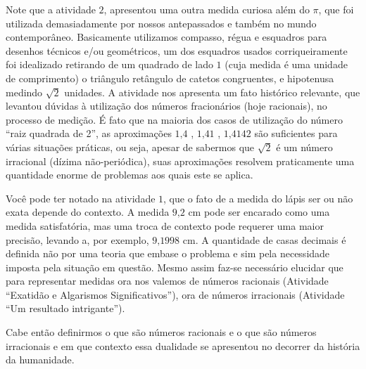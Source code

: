 Note que a atividade $2$, apresentou uma outra medida curiosa além do $\pi$, que foi utilizada demasiadamente por nossos antepassados e também no mundo contemporâneo. Basicamente utilizamos compasso, régua e esquadros para desenhos técnicos e/ou geométricos, um dos esquadros usados corriqueiramente foi idealizado retirando de um quadrado de lado $1$ (cuja medida é uma unidade de comprimento) o triângulo retângulo de catetos congruentes, e hipotenusa medindo $\sqrt{2}$ unidades. A atividade nos apresenta um fato histórico relevante, que levantou dúvidas à utilização dos números fracionários (hoje racionais), no processo de medição. É fato que na maioria dos casos de utilização do número “raiz quadrada de 2”, as aproximações $1\text{,}4$ , $1\text{,}41$ , $1\text{,}4142$ são suficientes para várias situações práticas, ou seja, apesar de sabermos que $\sqrt{2}$ é um número irracional (dízima não-periódica), suas aproximações resolvem praticamente uma quantidade enorme de problemas aos quais este se aplica.

Você pode ter notado na atividade $1$, que o fato de a medida do lápis ser ou não exata depende do contexto. A medida $9\text{,}2$ cm pode ser encarado como uma medida satisfatória, mas uma troca de contexto pode requerer uma maior precisão, levando a, por exemplo, $9\text{,}1998$ cm. A quantidade de casas decimais é definida não por uma teoria que embase o problema e sim pela necessidade imposta pela situação em questão. Mesmo assim faz-se necessário elucidar que para representar medidas ora nos valemos de números racionais (Atividade “Exatidão e Algarismos Significativos”), ora de números irracionais (Atividade “Um resultado intrigante”).

Cabe então definirmos o que são números racionais e o que são números irracionais e em que contexto essa dualidade se apresentou no decorrer da história da humanidade.

